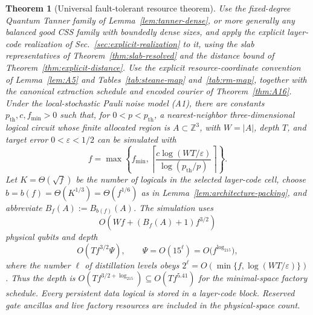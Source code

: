 \documentclass[aps,prx,reprint,superscriptaddress,nofootinbib,floatfix,longbibliography]{revtex4-2}
\newtheorem{theorem}{Theorem}[section]
\theoremstyle{definition}
\begin{document}
\begin{theorem}[Universal fault-tolerant resource theorem]\label{thm:A24}
Use the fixed-degree Quantum Tanner family of Lemma~\ref{lem:tanner-dense}, or more generally any balanced good CSS family with boundedly dense sizes, and apply the explicit layer-code realization of Sec.~\ref{sec:explicit-realization} to it, using the slab representatives of
Theorem~\ref{thm:slab-resolved} and the distance bound of Theorem~\ref{thm:explicit-distance}.  Use the explicit resource-coordinate
convention of Lemma~\ref{lem:A5} and Tables~\ref{tab:steane-map} and~\ref{tab:rm-map}, together
with the canonical extraction schedule and encoded courier of
Theorem~\ref{thm:A16}.  Under the local-stochastic Pauli noise model (A1),
there are constants $p_{\mathrm{th}},c,f_{\min}>0$ such that, for
$0<p<p_{\mathrm{th}}$, a nearest-neighbor three-dimensional logical circuit
whose finite allocated region is $A\subset\mathbb Z^3$, with $W=|A|$, depth
$T$, and target error $0<\varepsilon<1/2$ can be simulated with
\begin{equation}
 f=\max\left\{f_{\min},
 \left\lceil\frac{c\log(WT/\varepsilon)}{\log(p_{\mathrm{th}}/p)}\right\rceil
 \right\}.                                                         \tag{A25}
\end{equation}
Let $K=\Theta(\sqrt f)$ be the number of logicals in the selected
layer-code cell, choose $b=b(f)=\Theta(K^{1/3})=\Theta(f^{1/6})$ as in
Lemma~\ref{lem:architecture-packing}, and abbreviate
$B_f(A):=B_{b(f)}(A)$.  The simulation uses
\begin{equation}
 O\!\left(Wf+(B_f(A)+1)f^{3/2}\right)                             \tag{A26}
\end{equation}
physical qubits and depth
\begin{equation}
 O(Tf^{3/2}\Psi),\qquad
 \Psi=O(15^\ell)=O\bigl(f^{\log_215}\bigr),              \tag{A27}
\end{equation}
where the number $\ell$ of distillation levels obeys
$2^\ell=O(\min\{f,\log(WT/\varepsilon)\})$.  Thus the depth is
$O(Tf^{3/2+\log_215})\subseteq O(Tf^{5.41})$ for the minimal-space factory
schedule.
Every persistent data logical is stored in a layer-code block.  Reserved gate
ancillas and live factory resources are included in the physical-space count.
\end{theorem}
\end{document}
